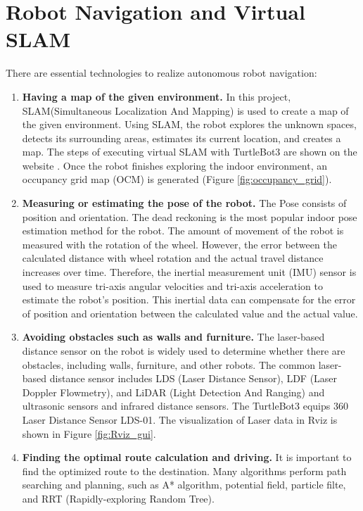 \section{Robot Navigation and Virtual SLAM}
\label{sec:navigation}

There are essential technologies to realize autonomous robot navigation: 
\begin{enumerate}
 \item \textbf{Having a map of the given environment.} In this project, SLAM(Simultaneous Localization And Mapping) is used to create a map of the given environment. Using SLAM, the robot explores the unknown spaces, detects its surrounding areas, estimates its current location, and creates a map. The steps of executing virtual SLAM with TurtleBot3 are shown on the website \cite{T3SLAM}. Once the robot finishes exploring the indoor environment, an occupancy grid map (OCM) is generated (Figure \ref{fig:occupancy_grid}).
 \item \textbf{Measuring or estimating the pose of the robot.} The Pose consists of position and orientation. The dead reckoning \cite{DEADRECKONING} is the most popular indoor pose estimation method for the robot. The amount of movement of the robot is measured with the rotation of the wheel. However, the error between the calculated distance with wheel rotation and the actual travel distance increases over time. Therefore, the inertial measurement unit (IMU) sensor \cite{Woojin17} is used to measure tri-axis angular velocities and tri-axis acceleration to estimate the robot's position. This inertial data can compensate for the error of position and orientation between the calculated value and the actual value.
 \item \textbf{Avoiding obstacles such as walls and furniture.} The laser-based distance sensor on the robot is widely used to determine whether there are obstacles, including walls, furniture, and other robots. The common laser-based distance sensor includes LDS (Laser Distance Sensor), LDF (Laser Doppler Flowmetry), and LiDAR (Light Detection And Ranging) and ultrasonic sensors and infrared distance sensors. The TurtleBot3 equips 360 Laser Distance Sensor LDS-01. The visualization of Laser data in Rviz is shown in Figure \ref{fig:Rviz_gui}.
 \item \textbf{Finding the optimal route calculation and driving.} It is important to find the optimized route to the destination. Many algorithms perform path searching and planning, such as A* algorithm\cite{ASEARCH}, potential field\cite{POTENTIAL}, particle filte\cite{PARTICLE}, and RRT (Rapidly-exploring Random Tree)\cite{RRT}.

\end{enumerate}
